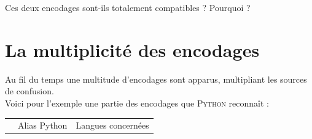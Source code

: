 \begin{exercice}[]
    Ces deux encodages sont-ils totalement compatibles ? Pourquoi ?
\end{exercice}

\section{La multiplicité des encodages}

Au fil du temps une multitude d'encodages sont apparus, multipliant les sources de confusion.\\
Voici pour l'exemple une partie des encodages que \textsc{Python} reconnaît :
\tabularstyled
\begin{center}
    {\tiny
        \begin{tabular}{CCC}
            
             & {\boxfont\color{white}Alias Python}                                      & {\boxfont\color{white}Langues concernées}             \\
            

\end{tabular}}
\end{center}
